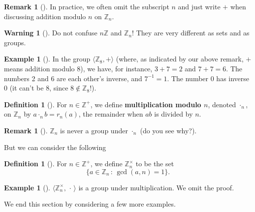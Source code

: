\documentclass[10pt,openany,oneside]{book}
\newcommand{\terminology}[1]{\textbf{#1}}
\theoremstyle{plain}
\theoremstyle{definition}
\newtheorem{definition}[theorem]{Definition}
\theoremstyle{definition}
\newtheorem{remark}[theorem]{Remark}
\newtheorem{warning}[theorem]{Warning}
\theoremstyle{definition}
\newtheorem{example}[theorem]{Example}
\theoremstyle{definition}
\numberwithin{equation}{section}
\def\Z{\mathbb{Z}}
\begin{document}
\begin{remark}[]\label{remark-14}
In practice, we often omit the subscript \(n\) and just write \(+\) when discussing addition modulo \(n\) on \(\Z_n\).%
\end{remark}
\begin{warning}[]\label{warning-11}
Do not confuse \(n\Z\) and \(\Z_n\)! They are very different as sets and as groups.%
\end{warning}
\begin{example}[]\label{example-17}
In the group \(\langle \Z_8,+\rangle\) (where, as indicated by our above remark, \(+\) means addition modulo \(8\)), we have, for instance, \(3+7=2\) and \(7+7=6\). The numbers 2 and 6 are each other's inverse, and \(7^{-1}=1\). The number \(0\) has inverse \(0\) (it can't be \(8\), since \(8\not\in \Z_8\)!).%
\end{example}
\begin{definition}[{}]\label{definition-27}
For \(n\in \Z^+\), we define \terminology{multiplication modulo \(n\)}, denoted \(\cdot_n\), on \(\Z_n\) by \(a\cdot_n b = r_n(a)\), the remainder when \(ab\) is divided by \(n\).%
\end{definition}
\begin{remark}[]\label{remark-15}
\(\Z_n\) is never a group under \(\cdot_n\) (do you see why?).%
\end{remark}
But we can consider the following%
\begin{definition}[{}]\label{definition-28}
\label{notation-43}
For \(n\in \Z^+\), we define \(\Z_n^{\times}\) to be the set%
\begin{equation*}
\{a\in \Z_n\,:\,\gcd(a,n)=1\}\text{.}
\end{equation*}
%
\end{definition}
\begin{example}[]\label{example-18}
\(\langle \Z_n^{\times},\,\cdot\, \rangle\) is a group under multiplication. We omit the proof.%
\end{example}
We end this section by considering a few more examples.%
\end{document}
